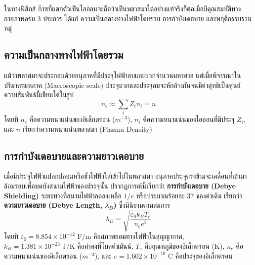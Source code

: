 ในทางฟิสิกส์ ก๊าซที่แตกตัวเป็นไอออนจะถือว่าเป็นพลาสมาได้อย่างแท้จริงก็ต่อเมื่อมีคุณสมบัติทางกายภาพครบ 3 ประการ ได้แก่ ความเป็นกลางทางไฟฟ้าโดยรวม การกำบังเดอบาย และพฤติกรรมรวมหมู่

\subsection{ความเป็นกลางทางไฟฟ้าโดยรวม}

แม้ว่าพลาสมาจะประกอบด้วยอนุภาคที่มีประจุไฟฟ้าลบและบวกจำนวนมหาศาล แต่เมื่อพิจารณาในปริมาตรมหภาค (Macroscopic scale) ประจุบวกและประจุลบจะหักล้างกันจนมีค่าสุทธิเป็นศูนย์ ความสัมพันธ์นี้เขียนได้ในรูป
\begin{equation}
    n_e \approx \sum_i Z_i n_i = n
\end{equation}
โดยที่ $n_e$ คือความหนาแน่นของอิเล็กตรอน ($m^{-3}$), $n_i$ คือความหนาแน่นของไอออนที่มีประจุ $Z_i$, และ $n$ เรียกว่าความหนาแน่นพลาสมา (Plasma Density)

\subsection{การกำบังเดอบายและความยาวเดอบาย}

เมื่อมีประจุไฟฟ้าแปลกปลอมหรือขั้วไฟฟ้าใส่เข้าไปในพลาสมา อนุภาคประจุตรงข้ามจะเคลื่อนที่เข้ามาล้อมรอบเพื่อบดบังสนามไฟฟ้าของประจุนั้น ปรากฏการณ์นี้เรียกว่า \textbf{การกำบังเดอบาย (Debye Shielding)} ระยะทางที่สนามไฟฟ้าลดลงเหลือ $1/e$ หรือประมาณร้อยละ 37 ของค่าเดิม เรียกว่า \textbf{ความยาวเดอบาย (Debye Length, $\lambda_D$)} ซึ่งมีนิยามตามสมการ
\begin{equation}
    \lambda_D = \sqrt{\frac{\varepsilon_0 k_B T_e}{n_e e^2}}
    \label{eq:debye_length}
\end{equation}
โดยที่ $\varepsilon_0 = 8.854 \times 10^{-12}\text{ F/m}$ คือสภาพยอมทางไฟฟ้าในสุญญากาศ, $k_B = 1.381 \times 10^{-23}\text{ J/K}$ คือค่าคงที่โบลต์ซมันน์, $T_e$ คืออุณหภูมิของอิเล็กตรอน (K), $n_e$ คือความหนาแน่นของอิเล็กตรอน ($m^{-3}$), และ $e = 1.602 \times 10^{-19}\text{ C}$ คือประจุของอิเล็กตรอน

